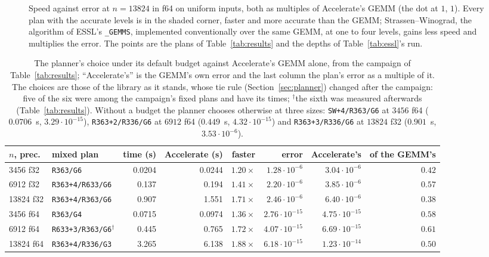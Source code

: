 \documentclass[11pt]{article}
\newcommand{\lv}[1]{\texttt{#1}}
\begin{document}
\begin{figure}[!tbp]
\caption{Speed against error at $n=13824$ in f64 on uniform inputs, both as
multiples of Accelerate's GEMM (the dot at $1$, $1$).  Every plan with the
accurate levels is in the shaded corner, faster and more accurate than the
GEMM; Strassen--Winograd, the algorithm of ESSL's \texttt{\_GEMMS}, implemented conventionally over the same GEMM, at one to four levels, gains
less speed and multiplies the error.  The points are the plans of
Table~\ref{tab:results} and the depths of Table~\ref{tab:essl}'s run.}
\label{fig:headline}
\end{figure}

\begin{table}[!tbp]
\centering\footnotesize
\setlength{\tabcolsep}{5pt}
\begin{tabular}{llrrrrrr}
\toprule
$n$, prec. & mixed plan & time (s) & Accelerate (s) & faster & error & Accelerate's & of the GEMM's\\
\midrule
3456 f32 & \lv{R363/G6} & 0.0204 & 0.0244 & $1.20\times$ & $1.28\cdot10^{-6}$ & $3.04\cdot10^{-6}$ & $0.42$\\
6912 f32 & \lv{R363+4/R633/G6} & 0.137 & 0.194 & $1.41\times$ & $2.20\cdot10^{-6}$ & $3.85\cdot10^{-6}$ & $0.57$\\
13824 f32 & \lv{R363+4/R363/G6} & 0.907 & 1.551 & $1.71\times$ & $2.46\cdot10^{-6}$ & $6.40\cdot10^{-6}$ & $0.38$\\
3456 f64 & \lv{R363/G4} & 0.0715 & 0.0974 & $1.36\times$ & $2.76\cdot10^{-15}$ & $4.75\cdot10^{-15}$ & $0.58$\\
6912 f64 & \lv{R633+3/R363/G6}$^\dagger$ & 0.445 & 0.765 & $1.72\times$ & $4.07\cdot10^{-15}$ & $6.69\cdot10^{-15}$ & $0.61$\\
13824 f64 & \lv{R363+4/R336/G3} & 3.265 & 6.138 & $1.88\times$ & $6.18\cdot10^{-15}$ & $1.23\cdot10^{-14}$ & $0.50$\\
\bottomrule
\end{tabular}
\caption{The planner's choice under its default budget against Accelerate's
GEMM alone, from the campaign of Table~\ref{tab:results}; ``Accelerate's''
is the GEMM's own error and the last column the plan's error as a multiple
of it.  The choices are those of the library as it stands, whose tie rule
(Section~\ref{sec:planner}) changed after the campaign: five of the six were
among the campaign's fixed plans and have its times; $^\dagger$the sixth was measured
afterwards (Table~\ref{tab:results}).  Without a budget the
planner chooses otherwise at three sizes: \lv{SW+4/R363/G6} at $3456$ f64
($0.0706$~s, $3.29\cdot10^{-15}$), \lv{R363+2/R336/G6} at $6912$ f64
($0.449$~s, $4.32\cdot10^{-15}$) and \lv{R363+3/R336/G6} at $13824$ f32
($0.901$~s, $3.53\cdot10^{-6}$).}
\label{tab:intro-acc}
\end{table}
\end{document}
